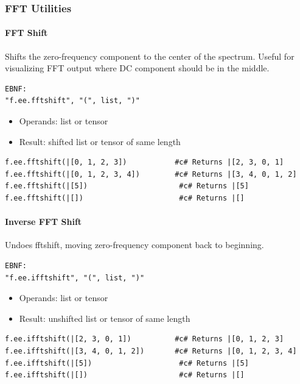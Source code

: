 \subsubsection{FFT Utilities}

\paragraph{FFT Shift}
Shifts the zero-frequency component to the center of the spectrum. Useful for visualizing FFT output where DC component should be in the middle.
\begin{verbatim}
EBNF:
"f.ee.fftshift", "(", list, ")"
\end{verbatim}
\begin{itemize}
\item Operands: list or tensor
\item Result: shifted list or tensor of same length
\end{itemize}
\begin{verbatim}
f.ee.fftshift(|[0, 1, 2, 3])           #c# Returns |[2, 3, 0, 1]
f.ee.fftshift(|[0, 1, 2, 3, 4])        #c# Returns |[3, 4, 0, 1, 2]
f.ee.fftshift(|[5])                     #c# Returns |[5]
f.ee.fftshift(|[])                      #c# Returns |[]
\end{verbatim}

\paragraph{Inverse FFT Shift}
Undoes fftshift, moving zero-frequency component back to beginning.
\begin{verbatim}
EBNF:
"f.ee.ifftshift", "(", list, ")"
\end{verbatim}
\begin{itemize}
\item Operands: list or tensor
\item Result: unshifted list or tensor of same length
\end{itemize}
\begin{verbatim}
f.ee.ifftshift(|[2, 3, 0, 1])          #c# Returns |[0, 1, 2, 3]
f.ee.ifftshift(|[3, 4, 0, 1, 2])       #c# Returns |[0, 1, 2, 3, 4]
f.ee.ifftshift(|[5])                    #c# Returns |[5]
f.ee.ifftshift(|[])                     #c# Returns |[]
\end{verbatim}

